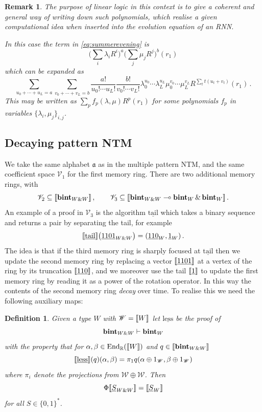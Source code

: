 \documentclass[english,letter paper,12pt,leqno]{article}
\theoremstyle{example}
\newtheorem{definition}[theorem]{Definition}
\newtheorem{remark}[theorem]{Remark}
\numberwithin{equation}{section}
\def\be{\begin{equation}}
\def\ee{\end{equation}}
\DeclareMathOperator{\End}{End}
\begin{document}
\begin{remark} The purpose of linear logic in this context is to give a coherent and general way of writing down such polynomials, which realise a given computational idea when inserted into the evolution equation of an RNN.

In this case the term in \eqref{eq:summerevening} is
\be\label{eq:crazyhorse_alt}
\big( \sum_i \lambda_i R^{i} \big)^a \big( \sum_j \mu_j R^{j} \big)^b (r_1)
\ee 
which can be expanded as
\be
\sum_{u_0 + \cdots + u_L = a}\sum_{v_0 + \cdots + v_L = b} \frac{a!}{u_0! \cdots u_L!} \frac{b!}{v_0! \cdots v_L!} \lambda_0^{u_0} \cdots \lambda_L^{u_L} \mu_0^{v_0} \cdots \mu_L^{v_L}  R^{\sum_t t (u_t + v_t)}(r_1)\,.
\ee
This may be written as $\sum_p f_p(\lambda, \mu) R^p(r_1)$ for some polynomials $f_p$ in variables $\{ \lambda_i, \mu_j \}_{i,j}$. 
\end{remark}

\subsection{Decaying pattern NTM}

We take the same alphabet $\mathfrak{a}$ as in the multiple pattern NTM, and the same coefficient space $\mathscr{V}_1$ for the first memory ring. There are two additional memory rings, with
\[
\mathscr{V}_2 \subseteq \llbracket \textbf{bint}_{W \& W} \rrbracket\,, \qquad \mathscr{V}_3 \subseteq \llbracket \textbf{bint}_{W \& W} \multimap \textbf{bint}_W \,\&\, \textbf{bint}_W \rrbracket\,.
\]
An example of a proof in $\mathscr{V}_3$ is the algorithm $\underline{\mathrm{tail}}$ which takes a binary sequence and returns a pair by separating the tail, for example
\[
\llbracket \underline{\mathrm{tail}} \rrbracket\big( \underline{1101}_{W \& W} \big) = (\underline{110}_W, \underline{1}_W)\,.
\]
The idea is that if the third memory ring is sharply focused at $\underline{\mathrm{tail}}$ then we update the second memory ring by replacing a vector $\llbracket \underline{1101} \rrbracket$ at a vertex of the ring by its truncation $\llbracket \underline{110} \rrbracket$, and we moreover use the tail $\llbracket \underline{1} \rrbracket$ to update the first memory ring by reading it as a power of the rotation operator. In this way the contents of the second memory ring \emph{decay} over time. To realise this we need the following auxiliary maps:

\begin{definition}\label{definition:proofless} Given a type $W$ with $\mathscr{W} = \llbracket W \rrbracket$ let $\underline{\mathrm{less}}$ be the proof of
\[
\textbf{bint}_{W \& W} \vdash \textbf{bint}_W
\]
with the property that for $\alpha, \beta \in \End_{\mathbb{R}}(\den{W})$ and $q \in \llbracket \textbf{bint}_{W \& W} \rrbracket$
\[
\llbracket \underline{\mathrm{less}} \rrbracket(q)( \alpha, \beta ) = \pi_1 q( \alpha \oplus 1_{\mathscr{W}}, \beta \oplus 1_{\mathscr{W}} )
\]
where $\pi_i$ denote the projections from $\mathscr{W} \oplus \mathscr{W}$. Then
\[
\Phi \llbracket \underline{S}_{W \& W} \rrbracket = \llbracket \underline{S}_W \rrbracket
\]
for all $S \in \{0,1\}^*$.
\end{definition}
\end{document}
